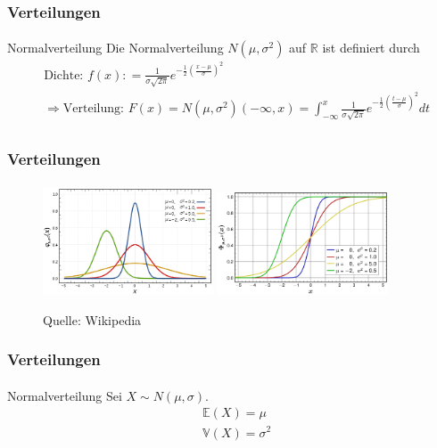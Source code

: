 \documentclass{beamer}
\begin{document}
\begin{frame}
    \frametitle{Verteilungen}
\framesubtitle{}

\begin{block}{Normalverteilung}
Die Normalverteilung $N{(\mu,\sigma^2)}$ auf $\mathbb{R}$ ist definiert durch
\begin{align*}
& \text{Dichte: } f (x) : = \frac 1{\sigma \sqrt{2\pi}}e^{- \frac {1}{2} (\frac{x- \mu}{ \sigma})^2} \\
&  \Rightarrow \text{Verteilung: } F(x) = N{(\mu,\sigma^2)}(-\infty , x) =  \int_{-\infty}^{x}  \frac 1{\sigma \sqrt{2\pi}}e^{- \frac {1}{2} (\frac{t- \mu}{ \sigma})^2}dt\\
\end{align*}

\end{block}
 \end{frame}



\begin{frame}
    \frametitle{ Verteilungen}
\framesubtitle{}
\begin{figure}[htp]
      \centering
    \includegraphics[width=0.45\textwidth]{img/normal}
    \includegraphics[width=0.45\textwidth]{img/normaldist}
      \caption{Quelle: Wikipedia}
\end{figure}

 \end{frame}


\begin{frame}
    \frametitle{Verteilungen}
\framesubtitle{}

\begin{block}{Normalverteilung}
Sei $X \sim N(\mu, \sigma)$.
\begin{align*}
& \mathbb{E}(X) = \mu \\
& \mathbb{V}(X) = \sigma^2
\end{align*}
\end{block}
 \end{frame}
\end{document}

